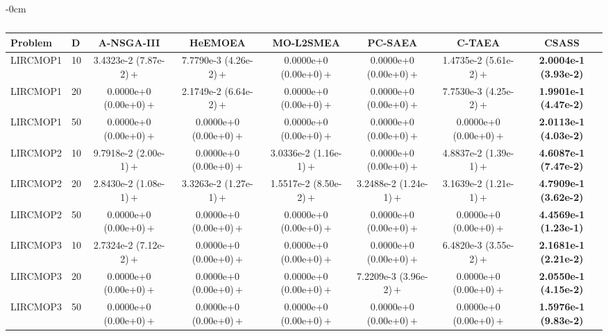\begin{table}[!htbp]
\begin{ROneBlock}
\begin{adjustwidth}{-\extralength}{0cm}
\centering
\scriptsize
\setlength{\tabcolsep}{3pt}
\renewcommand{\arraystretch}{1.12}
\caption{}\label{tab:lircmop-hv}
\begin{tabular*}{\linewidth}{@{\extracolsep{\fill}}llcccccc@{}}
\toprule
Problem & D & A-NSGA-III & HeEMOEA & MO-L2SMEA & PC-SAEA & C-TAEA & CSASS \\
\midrule
LIRCMOP1 & 10 & 3.4323e-2 (7.87e-2)\,$+$ & 7.7790e-3 (4.26e-2)\,$+$ & 0.0000e+0 (0.00e+0)\,$+$ & 0.0000e+0 (0.00e+0)\,$+$ & 1.4735e-2 (5.61e-2)\,$+$ & \textbf{2.0004e-1 (3.93e-2)} \\
LIRCMOP1 & 20 & 0.0000e+0 (0.00e+0)\,$+$ & 2.1749e-2 (6.64e-2)\,$+$ & 0.0000e+0 (0.00e+0)\,$+$ & 0.0000e+0 (0.00e+0)\,$+$ & 7.7530e-3 (4.25e-2)\,$+$ & \textbf{1.9901e-1 (4.47e-2)} \\
LIRCMOP1 & 50 & 0.0000e+0 (0.00e+0)\,$+$ & 0.0000e+0 (0.00e+0)\,$+$ & 0.0000e+0 (0.00e+0)\,$+$ & 0.0000e+0 (0.00e+0)\,$+$ & 0.0000e+0 (0.00e+0)\,$+$ & \textbf{2.0113e-1 (4.03e-2)} \\
LIRCMOP2 & 10 & 9.7918e-2 (2.00e-1)\,$+$ & 0.0000e+0 (0.00e+0)\,$+$ & 3.0336e-2 (1.16e-1)\,$+$ & 0.0000e+0 (0.00e+0)\,$+$ & 4.8837e-2 (1.39e-1)\,$+$ & \textbf{4.6087e-1 (7.47e-2)} \\
LIRCMOP2 & 20 & 2.8430e-2 (1.08e-1)\,$+$ & 3.3263e-2 (1.27e-1)\,$+$ & 1.5517e-2 (8.50e-2)\,$+$ & 3.2488e-2 (1.24e-1)\,$+$ & 3.1639e-2 (1.21e-1)\,$+$ & \textbf{4.7909e-1 (3.62e-2)} \\
LIRCMOP2 & 50 & 0.0000e+0 (0.00e+0)\,$+$ & 0.0000e+0 (0.00e+0)\,$+$ & 0.0000e+0 (0.00e+0)\,$+$ & 0.0000e+0 (0.00e+0)\,$+$ & 0.0000e+0 (0.00e+0)\,$+$ & \textbf{4.4569e-1 (1.23e-1)} \\
LIRCMOP3 & 10 & 2.7324e-2 (7.12e-2)\,$+$ & 0.0000e+0 (0.00e+0)\,$+$ & 0.0000e+0 (0.00e+0)\,$+$ & 0.0000e+0 (0.00e+0)\,$+$ & 6.4820e-3 (3.55e-2)\,$+$ & \textbf{2.1681e-1 (2.21e-2)} \\
LIRCMOP3 & 20 & 0.0000e+0 (0.00e+0)\,$+$ & 0.0000e+0 (0.00e+0)\,$+$ & 0.0000e+0 (0.00e+0)\,$+$ & 7.2209e-3 (3.96e-2)\,$+$ & 0.0000e+0 (0.00e+0)\,$+$ & \textbf{2.0550e-1 (4.15e-2)} \\
LIRCMOP3 & 50 & 0.0000e+0 (0.00e+0)\,$+$ & 0.0000e+0 (0.00e+0)\,$+$ & 0.0000e+0 (0.00e+0)\,$+$ & 0.0000e+0 (0.00e+0)\,$+$ & 0.0000e+0 (0.00e+0)\,$+$ & \textbf{1.5976e-1 (9.83e-2)} \\

\end{tabular*}
\end{adjustwidth}
\end{ROneBlock}
\end{table}
